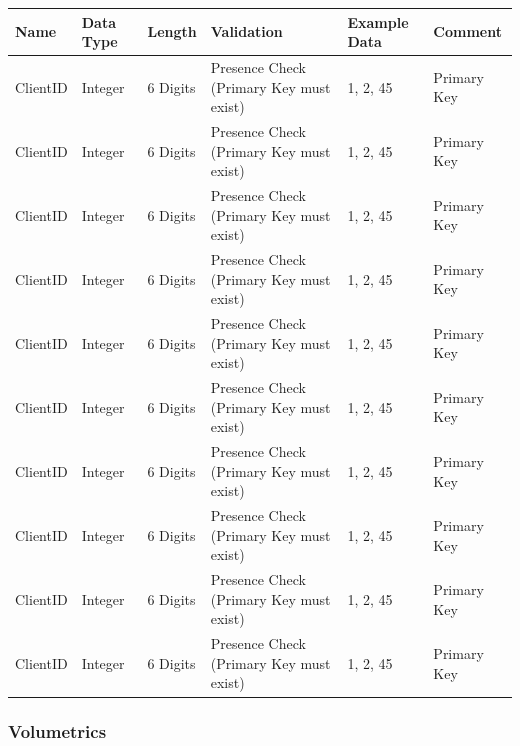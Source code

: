\begin{flushleft}
\begin{longtable}{|p{2cm}|p{2cm}|p{2cm}|p{2cm}|p{2cm}|p{2cm}|}
\hline
\textbf{Name} & \textbf{Data Type} & \textbf{Length} & \textbf{Validation} & \textbf{Example Data} & \textbf{Comment} \\ \hline
ClientID & Integer & 6 Digits & Presence Check (Primary Key must exist) & 1, 2, 45 & Primary Key \\ \hline
ClientID & Integer & 6 Digits & Presence Check (Primary Key must exist) & 1, 2, 45 & Primary Key \\ \hline 
ClientID & Integer & 6 Digits & Presence Check (Primary Key must exist) & 1, 2, 45 & Primary Key \\ \hline 
ClientID & Integer & 6 Digits & Presence Check (Primary Key must exist) & 1, 2, 45 & Primary Key \\ \hline 
ClientID & Integer & 6 Digits & Presence Check (Primary Key must exist) & 1, 2, 45 & Primary Key \\ \hline 
ClientID & Integer & 6 Digits & Presence Check (Primary Key must exist) & 1, 2, 45 & Primary Key \\ \hline 
ClientID & Integer & 6 Digits & Presence Check (Primary Key must exist) & 1, 2, 45 & Primary Key \\ \hline 
ClientID & Integer & 6 Digits & Presence Check (Primary Key must exist) & 1, 2, 45 & Primary Key \\ \hline 
ClientID & Integer & 6 Digits & Presence Check (Primary Key must exist) & 1, 2, 45 & Primary Key \\ \hline 
ClientID & Integer & 6 Digits & Presence Check (Primary Key must exist) & 1, 2, 45 & Primary Key \\ \hline  


\end{longtable}
\end{flushleft}


\subsubsection{Volumetrics}


